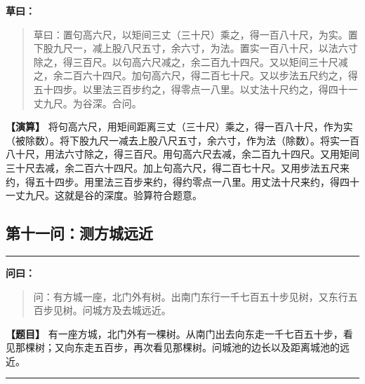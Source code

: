 \documentclass[11pt,a4paper]{article}
\newenvironment{mathproblem}[1][]{%
  \medskip\noindent\rule{\textwidth}{0.4pt}%
  \par\noindent{\Large\bfseries\color{sectioncolor}#1}\par\nopagebreak%
  \smallskip%
}{%
  \par\noindent\rule{\textwidth}{0.4pt}\medskip%
}
\newcommand{\wenlabel}{\textbf{\color{origcolor}问曰：}}
\newcommand{\caolabel}{\textbf{\color{origcolor}草曰：}}
\newcommand{\modwenlabel}{\textbf{\color{modcolor}【题目】}}
\newcommand{\modcaolabel}{\textbf{\color{modcolor}【演算】}}
\begin{document}
\begin{originaltext}
\caolabel
\begin{quote}
\textcolor{origcolor}{%
草曰：置句高六尺，以矩间三丈（三十尺）乘之，得一百八十尺，为实。置下股九尺一，减上股八尺五寸，余六寸，为法。置实一百八十尺，以法六寸除之，得三百尺。以句高六尺减之，余二百九十四尺。又以矩间三十尺减之，余二百六十四尺。加句高六尺，得二百七十尺。又以步法五尺约之，得五十四步。以里法三百步约之，得零点一八里。以丈法十尺约之，得四十一丈九尺。为谷深。合问。
}
\end{quote}
\end{originaltext}

\begin{moderntext}
\modcaolabel
将句高六尺，用矩间距离三丈（三十尺）乘之，得一百八十尺，作为实（被除数）。将下股九尺一减去上股八尺五寸，余六寸，作为法（除数）。将实一百八十尺，用法六寸除之，得三百尺。用句高六尺去减，余二百九十四尺。又用矩间三十尺去减，余二百六十四尺。加上句高六尺，得二百七十尺。又用步法五尺来约，得五十四步。用里法三百步来约，得约零点一八里。用丈法十尺来约，得四十一丈九尺。这就是谷的深度。验算符合题意。
\end{moderntext}

\newpage

\subsection*{第十一问：测方城远近}

\begin{mathproblem}[\textbf{第十一问：测方城远近}]

\begin{originaltext}
\wenlabel
\begin{quote}
\textcolor{origcolor}{%
问：有方城一座，北门外有树。出南门东行一千七百五十步见树，又东行五百步见树。问城方及去城远近。
}
\end{quote}
\end{originaltext}

\begin{moderntext}
\modwenlabel
有一座方城，北门外有一棵树。从南门出去向东走一千七百五十步，看见那棵树；又向东走五百步，再次看见那棵树。问城池的边长以及距离城池的远近。
\end{moderntext}

\end{mathproblem}
\end{document}

